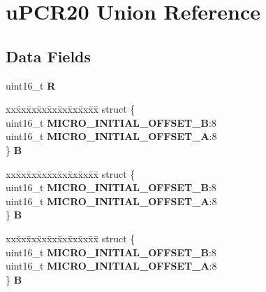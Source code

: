 \hypertarget{unionuPCR20}{}\section{u\+P\+C\+R20 Union Reference}
\label{unionuPCR20}
\subsection*{Data Fields}
\begin{DoxyCompactItemize}
\item 
\mbox{\label{unionuPCR20_a9060b076d63de0b95189a448ce4e186c}} 
uint16\+\_\+t {\bfseries R}
\item 
\mbox{\label{unionuPCR20_af58465c66a3d0849c878677ede39188e}} 
\begin{tabbing}
xx\=xx\=xx\=xx\=xx\=xx\=xx\=xx\=xx\=\kill
struct \{\\
\>uint16\_t {\bfseries MICRO\_INITIAL\_OFFSET\_B}:8\\
\>uint16\_t {\bfseries MICRO\_INITIAL\_OFFSET\_A}:8\\
\} {\bfseries B}\\

\end{tabbing}\item 
\mbox{\label{unionuPCR20_ac50d874e2c8008044bc0b79ce7eebb35}} 
\begin{tabbing}
xx\=xx\=xx\=xx\=xx\=xx\=xx\=xx\=xx\=\kill
struct \{\\
\>uint16\_t {\bfseries MICRO\_INITIAL\_OFFSET\_B}:8\\
\>uint16\_t {\bfseries MICRO\_INITIAL\_OFFSET\_A}:8\\
\} {\bfseries B}\\

\end{tabbing}\item 
\mbox{\label{unionuPCR20_ac62ca5d51481a890e84dd36f996e6813}} 
\begin{tabbing}
xx\=xx\=xx\=xx\=xx\=xx\=xx\=xx\=xx\=\kill
struct \{\\
\>uint16\_t {\bfseries MICRO\_INITIAL\_OFFSET\_B}:8\\
\>uint16\_t {\bfseries MICRO\_INITIAL\_OFFSET\_A}:8\\
\} {\bfseries B}\\


\end{tabbing}
\end{DoxyCompactItemize}
